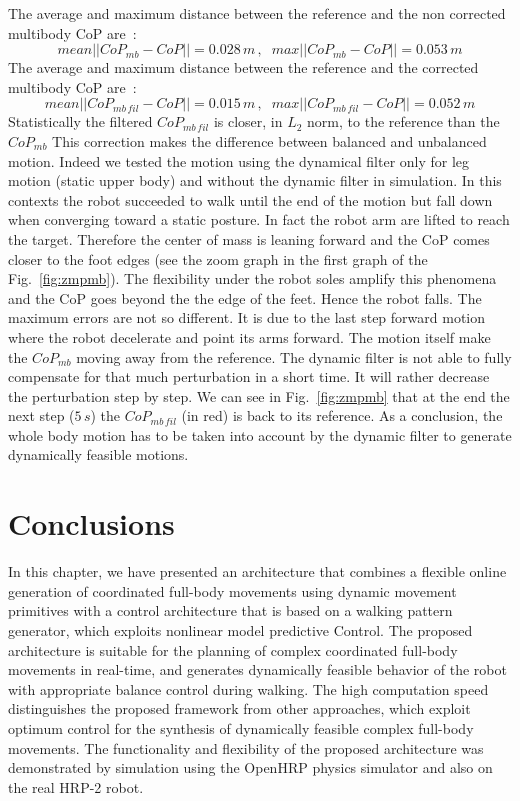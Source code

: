 The average and maximum distance between the reference and the non corrected multibody CoP are~:
$$mean ||CoP_{mb}-CoP|| = 0.028 \,m \,,\;\; max ||CoP_{mb}-CoP|| = 0.053 \,m$$
The average and maximum distance between the reference and the corrected multibody CoP are~:
$$ mean ||CoP_{mb\,fil}-CoP|| = 0.015 \,m \,,\;\; max ||CoP_{mb\,fil}-CoP|| = 0.052 \,m$$
Statistically the filtered $CoP_{mb\,fil}$ is closer, in $L_2$ norm, to the
reference than the $CoP_{mb}$
This correction makes the difference between balanced and unbalanced motion.
Indeed we tested the motion using the dynamical filter only for leg motion
(static upper body) and without the dynamic filter in simulation.
In this contexts the robot succeeded to walk until the end of the motion
but fall down when
converging toward a static posture.
In fact the robot arm are lifted to reach the target.
Therefore the center of mass is leaning forward and the CoP comes closer to the foot edges (see the zoom graph in the first graph of the Fig.~\ref{fig:zmpmb}).
The flexibility under the robot soles amplify this phenomena and the CoP goes beyond the
the edge of the feet.
Hence the robot falls.
The maximum errors are not so different.
It is due to the last step forward motion where the robot decelerate and point its arms forward.
The motion itself make the $CoP_{mb}$ moving away from the reference.
The dynamic filter is not able to fully compensate for that much perturbation in a short time.
It will rather decrease the perturbation step by step.
We can see in Fig.~\ref{fig:zmpmb} that at the end the next step ($5\,s$) the $CoP_{mb\,fil}$ (in red) is back to its reference.
As a conclusion, the whole body motion has to be taken into account by the dynamic filter to generate dynamically feasible motions.

\section{Conclusions}
\label{sc:Conclusions}
In this chapter, we have presented an architecture that combines a flexible online
generation of coordinated full-body movements using dynamic movement primitives with a control
architecture that is based on a walking pattern generator, which exploits nonlinear model predictive Control.
The proposed architecture is suitable for the planning of complex coordinated full-body movements in
real-time, and generates dynamically feasible behavior of the robot with appropriate balance
control during walking. The high computation speed distinguishes the proposed framework from
other approaches, which exploit optimum control for the synthesis of dynamically feasible complex
full-body movements.
The functionality and flexibility of the proposed architecture was demonstrated
by simulation using the OpenHRP physics simulator and also on the real HRP-2 robot.

